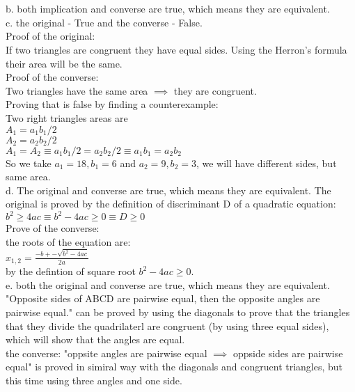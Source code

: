 \documentclass{article}
\begin{document}
\section{}
b. both implication and converse are true, which means they are equivalent.\\
c. the original - True and the converse - False.\\
Proof of the original:\\
If two triangles are congruent they have equal sides. Using the Herron's formula their area will be the same.\\

Proof of the converse:\\
Two triangles have the same area $\implies$ they are congruent.\\
Proving that is false by finding a counterexample:\\

Two right triangles areas are\\
$A_1 = a_1b_1/2$\\
$A_2 = a_2b_2/2$\\
$A_1 = A_2 \equiv a_1b_1/2 = a_2b_2/2 \equiv a_1b_1 = a_2b_2$\\
So we take $a_1 = 18, b_1 = 6$ and $a_2 = 9, b_2 = 3$, we will have different sides, but same area.\\

d. The original and converse are true, which means they are equivalent.
The original is proved by the definition of discriminant D of a quadratic equation:\\
$b^2 \geq 4ac \equiv b^2 - 4ac \geq 0 \equiv D \geq 0$\\

Prove of the converse:\\
the roots of the equation are:\\
$x_{1,2} = \frac{-b +- \sqrt{b^2 - 4ac}}{2a}$\\
by the defintion of square root $b^2 - 4ac \geq 0$.\\

e. both the original and converse are true, which means they are equivalent.\\
"Opposite sides of ABCD are pairwise equal, then the opposite angles are pairwise equal." can be proved by using the diagonals to prove that the triangles that they divide the quadrilaterl are congruent (by using three equal sides), which will show that the angles are equal.\\
the converse: 
"oppsite angles are pairwise equal $\implies$ oppside sides are pairwise equal" is proved in simiral way with the diagonals and congruent triangles, but this time using three angles and one side.\\
\end{document}
